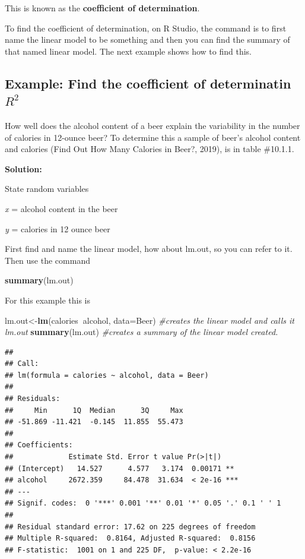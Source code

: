 \documentclass[
]{book}
\newenvironment{Shaded}{\begin{snugshade}}{\end{snugshade}}
\newcommand{\CommentTok}[1]{\textcolor[rgb]{0.56,0.35,0.01}{\textit{#1}}}
\newcommand{\DataTypeTok}[1]{\textcolor[rgb]{0.13,0.29,0.53}{#1}}
\newcommand{\KeywordTok}[1]{\textcolor[rgb]{0.13,0.29,0.53}{\textbf{#1}}}
\newcommand{\NormalTok}[1]{#1}
\newcommand{\OperatorTok}[1]{\textcolor[rgb]{0.81,0.36,0.00}{\textbf{#1}}}
\begin{document}
This is known as the \textbf{coefficient of determination}.

To find the coefficient of determination, on R Studio, the command is to first name the linear model to be something and then you can find the summary of that named linear model. The next example shows how to find this.

\hypertarget{example-find-the-coefficient-of-determinatin-r2}{%
\subsection{\texorpdfstring{Example: Find the coefficient of determinatin \(R^2\)}{Example: Find the coefficient of determinatin R\^{}2}}\label{example-find-the-coefficient-of-determinatin-r2}}

How well does the alcohol content of a beer explain the variability in the number of calories in 12-ounce beer? To determine this a sample of beer's alcohol content and calories (Find Out How Many Calories in Beer?, 2019), is in table \#10.1.1.

\textbf{Solution:}

State random variables

\emph{x} = alcohol content in the beer

\emph{y} = calories in 12 ounce beer

First find and name the linear model, how about lm.out, so you can refer to it. Then use the command

\begin{Shaded}
\begin{Highlighting}[]
\KeywordTok{summary}\NormalTok{(lm.out)}
\end{Highlighting}
\end{Shaded}

For this example this is

\begin{Shaded}
\begin{Highlighting}[]
\NormalTok{lm.out<-}\KeywordTok{lm}\NormalTok{(calories}\OperatorTok{~}\NormalTok{alcohol, }\DataTypeTok{data=}\NormalTok{Beer) }\CommentTok{#creates the linear model and calls it lm.out}
\KeywordTok{summary}\NormalTok{(lm.out) }\CommentTok{#creates a summary of the linear model created.}
\end{Highlighting}
\end{Shaded}

\begin{verbatim}
## 
## Call:
## lm(formula = calories ~ alcohol, data = Beer)
## 
## Residuals:
##     Min      1Q  Median      3Q     Max 
## -51.869 -11.421  -0.145  11.855  55.473 
## 
## Coefficients:
##             Estimate Std. Error t value Pr(>|t|)    
## (Intercept)   14.527      4.577   3.174  0.00171 ** 
## alcohol     2672.359     84.478  31.634  < 2e-16 ***
## ---
## Signif. codes:  0 '***' 0.001 '**' 0.01 '*' 0.05 '.' 0.1 ' ' 1
## 
## Residual standard error: 17.62 on 225 degrees of freedom
## Multiple R-squared:  0.8164, Adjusted R-squared:  0.8156 
## F-statistic:  1001 on 1 and 225 DF,  p-value: < 2.2e-16
\end{verbatim}
\end{document}
